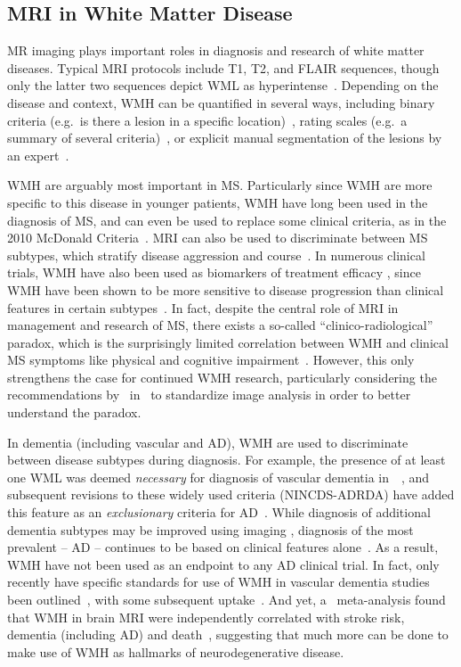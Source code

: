 \subsection{MRI in White Matter Disease}
MR imaging plays important roles in diagnosis and research of white matter diseases.
Typical MRI protocols include T1, T2, and FLAIR sequences,
though only the latter two sequences depict WML as hyperintense~\cite{Simon2006,Wardlaw2013}.
Depending on the disease and context, WMH can be quantified in several ways,
including binary criteria (e.g.\ is there a lesion in a specific location)~\cite{Polman2011},
rating scales (e.g.\ a summary of several criteria)~\cite{Fazekas1987},
or explicit manual segmentation of the lesions by an expert~\cite{Egger2017}.
\par
WMH are arguably most important in MS.
Particularly since WMH are more specific to this disease in younger patients,
WMH have long been used in the diagnosis of MS,
and can even be used to replace some clinical criteria,
as in the 2010 McDonald Criteria~\cite{Polman2011}.
MRI can also be used to discriminate between MS subtypes,
which stratify disease aggression and course~\cite{Polman2011,Lublin2014,Traboulsee2015}.
In numerous clinical trials, WMH have also been used as biomarkers of treatment efficacy
\cite{Sormani2013,Fahrbach2013,Ziemssen2015},
since WMH have been shown to be more sensitive to disease progression than clinical features
in certain subtypes~\cite{ORiordan1998}.
In fact, despite the central role of MRI in management and research of MS,
there exists a so-called ``clinico-radiological'' paradox,
which is the surprisingly limited correlation between WMH and clinical MS symptoms
like physical and cognitive impairment~\cite{Mollison2017}.
However, this only strengthens the case for continued WMH research,
particularly considering the recommendations by~\citeauthor{Mollison2017} in~\cite{Mollison2017}
to standardize image analysis in order to better understand the paradox.
\par
In dementia (including vascular and AD),
WMH are used to discriminate between disease subtypes during diagnosis.
For example, the presence of at least one WML was deemed \textit{necessary}
for diagnosis of vascular dementia in~\citeyear{Roman1993}~\cite{Roman1993},
and subsequent revisions to these widely used criteria (NINCDS-ADRDA)
have added this feature as an \textit{exclusionary} criteria for AD~\cite{Dubois2007}.
While diagnosis of additional dementia subtypes may be improved using imaging
\cite{Sorbi2012,Verhagen2016}, diagnosis of the most prevalent -- AD --
continues to be based on clinical features alone~\cite{McKhann2011}.
As a result, WMH have not been used as an endpoint to any AD clinical trial.
In fact, only recently have specific standards for
use of WMH in vascular dementia studies been outlined~\cite{Wardlaw2015,Wardlaw2013},
with some subsequent uptake~\cite{VanWesten2016}.
And yet, a~\citeyear{Debette2010} meta-analysis found that
WMH in brain MRI were independently correlated with
stroke risk, dementia (including AD) and death~\cite{Debette2010},
suggesting that much more can be done to make use of WMH as hallmarks of neurodegenerative disease.
